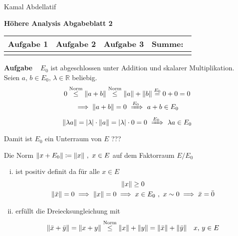 \documentclass[a4paper, 12pt]{scrartcl}
\newcounter{taski}
\newcommand{\task}{\stepcounter{taski}\textbf{Aufgabe \arabic{taski}}~}
\begin{document}
\begin{flushright}
    Kamal Abdellatif
\end{flushright}
\begin{center}
    \textbf{Höhere Analysis Abgabeblatt 2}\\[2em]
	\def\arraystretch{2}
    \begin{tabular}{|l|l|l||p{18mm}|}
        \hline
         Aufgabe 1 & Aufgabe 2 & Aufgabe 3 & Summe:~ \\
         \hline &&&\\
         \hline  
    \end{tabular}
\end{center}

\task
$E_0$ ist abgeschlossen unter Addition und skalarer Multiplikation. Seien $a,\, b \in E_0,\, \lambda \in \mathbb{R}$ beliebig.
\begin{gather*}
    0 \stackrel{\text{Norm}}\leq \norm{a+b} \stackrel{\text{Norm}}\leq \norm{a} + \norm{b} \stackrel{E_0}= 0 + 0 = 0 \\
    \implies \norm{a+b} = 0 ~\xRightarrow{E_0}~ a + b \in E_0 \\
    \norm{\lambda a} = |\lambda| \cdot \norm{a} = |\lambda| \cdot 0 = 0 ~\xRightarrow{E_0}~ \lambda a \in E_0
\end{gather*}
Damit ist $E_0$ ein Unterraum von $E$ ???

Die Norm $\norm{x + E_0} \coloneqq \norm{x} ~,~ x \in E$ auf dem Faktorraum $E/E_0$
\begin{enumerate}[(i)]
\item ist positiv definit da für alle $x \in E$
\begin{gather*}
    \norm{x} \geq 0 \\
    \norm{\bar x} = 0 \implies \norm{x} = 0 \implies x \in E_0 ~,~ x \sim 0 \implies \bar x = \bar 0
\end{gather*}
\item erfüllt die Dreiecksungleichung mit
\[ \norm{\bar x + \bar y} = \norm{x + y} \stackrel{\text{Norm}}\leq \norm{x} + \norm{y} = \norm{\bar x} + \norm{\bar y} \quad x,\, y \in E\]
\end{enumerate}
\end{document}
